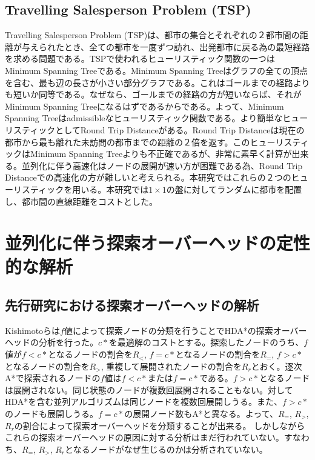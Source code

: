 \documentclass{jsarticle}
\renewcommand{\textbf}{} %
\begin{document}
\subsection{Travelling Salesperson Problem (TSP)}
Travelling Salesperson Problem (TSP)は、都市の集合とそれぞれの２都市間の距離が与えられたとき、全ての都市を一度ずつ訪れ、出発都市に戻る為の最短経路を求める問題である。TSPで使われるヒューリスティック関数の一つは\textbf{Minimum Spanning Tree}である。Minimum Spanning Treeはグラフの全ての頂点を含む、最も辺の長さが小さい部分グラフである。これはゴールまでの経路よりも短いか同等である。なぜなら、ゴールまでの経路の方が短いならば、それがMinimum Spanning Treeになるはずであるからである。よって、Minimum Spanning Treeはadmissibleなヒューリスティック関数である。より簡単なヒューリスティックとしてRound Trip Distanceがある。Round Trip Distanceは現在の都市から最も離れた未訪問の都市までの距離の２倍を返す。このヒューリスティックはMinimum Spanning Treeよりも不正確であるが、非常に素早く計算が出来る。並列化に伴う高速化はノードの展開が速い方が困難である為、Round Trip Distanceでの高速化の方が難しいと考えられる。本研究ではこれらの２つのヒューリスティックを用いる。本研究では$1\times1$の盤に対してランダムに都市を配置し、都市間の直線距離をコストとした。

\section{並列化に伴う探索オーバーヘッドの定性的な解析}
\label{sec:analysis1}

\subsection{先行研究における探索オーバーヘッドの解析}
Kishimotoらは$f$値によって探索ノードの分類を行うことでHDA*の探索オーバーヘッドの分析を行った\cite{Kishimoto2013}。$c*$を最適解のコストとする。探索したノードのうち、$f$値が$f < c*$となるノードの割合を$R_{<}$, $f = c*$となるノードの割合を$R_{=}$, $f > c*$となるノードの割合を$R_{>}$, 重複して展開されたノードの割合を$R_{r}$とおく。逐次A*で探索されるノードの$f$値は$f < c*$または$f = c*$である。$f > c*$となるノードは展開されない。同じ状態のノードが複数回展開されることもない。対してHDA*を含む並列アルゴリズムは同じノードを複数回展開しうる。また、$f > c*$のノードも展開しうる。$f = c*$の展開ノード数もA*と異なる。よって、$R_{=}$, $R_{>}$, $R_{r}$の割合によって探索オーバーヘッドを分類することが出来る。
しかしながらこれらの探索オーバーヘッドの原因に対する分析はまだ行われていない。すなわち、$R_{=}$, $R_{>}$, $R_{r}$となるノードがなぜ生じるのかは分析されていない。
\end{document}
